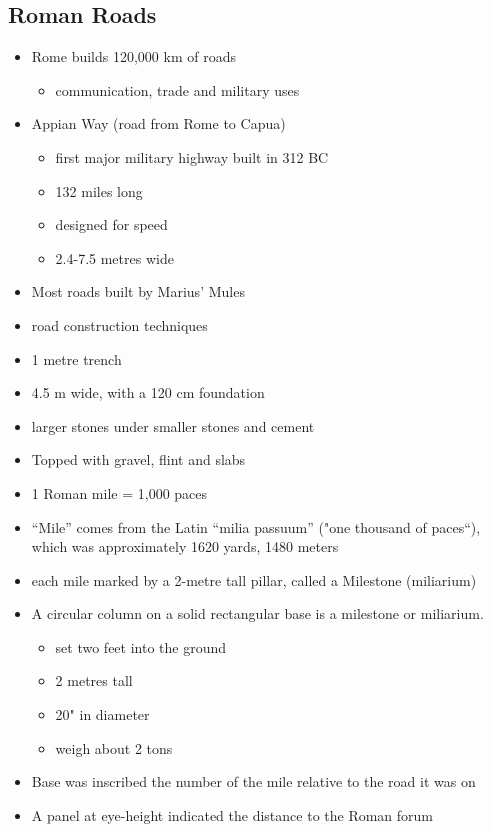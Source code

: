 \documentclass[12pt, twoside]{article}
\begin{document}
\begin{itemize}
\subsection{Roman Roads}
\begin{itemize}
\item Rome builds 120,000 km of roads
	\begin{itemize}
	\item communication, trade and military uses
	\end{itemize}
\item Appian Way (road from Rome to Capua)
	\begin{itemize}
	\item first major military highway built in 312 BC
	\item 132 miles long
	\item designed for speed
	\item 2.4-7.5 metres wide
	\end{itemize}
\item Most roads built by Marius’ Mules
\item road construction techniques
\item 1 metre trench
\item 4.5 m wide, with a 120 cm foundation
\item larger stones under smaller stones and cement
\item Topped with gravel, flint and slabs
\item 1 Roman mile = 1,000 paces
\item “Mile” comes from the Latin “milia passuum” ("one thousand of paces“), which was approximately 1620 yards, 1480 meters
\item each mile marked by a 2-metre tall pillar, called a Milestone (miliarium)
\item A circular column on a solid rectangular base is a milestone or miliarium.
	\begin{itemize}
	\item set two feet into the ground
	\item 2 metres tall
	\item 20" in diameter
	\item weigh about 2 tons
	\end{itemize}
\item Base was inscribed the number of the mile relative to the road it was on
\item A panel at eye-height indicated the distance to the Roman forum
	\begin{itemize}

\end{itemize}
\end{itemize}
\end{itemize}
\end{document}
